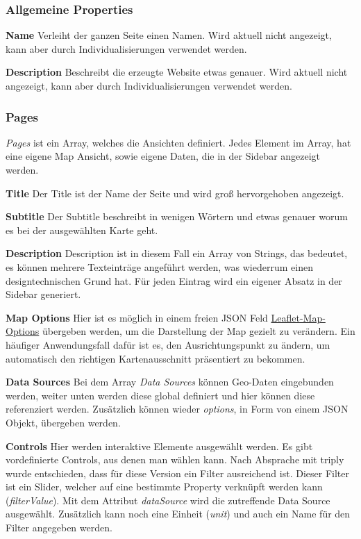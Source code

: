 \subsubsection{Allgemeine Properties}
\textbf{Name}
Verleiht der ganzen Seite einen Namen.
Wird aktuell nicht angezeigt, kann aber durch Individualisierungen verwendet werden.

\textbf{Description}
Beschreibt die erzeugte Website etwas genauer.
Wird aktuell nicht angezeigt, kann aber durch Individualisierungen verwendet werden.

\subsubsection{Pages}
\emph{Pages} ist ein Array, welches die Ansichten definiert.
Jedes Element im Array, hat eine eigene Map Ansicht, sowie eigene Daten, die in der Sidebar angezeigt werden.

\textbf{Title}
Der Title ist der Name der Seite und wird groß hervorgehoben angezeigt.

\textbf{Subtitle}
Der Subtitle beschreibt in wenigen Wörtern und etwas genauer worum es bei der ausgewählten Karte geht.

\textbf{Description}
Description ist in diesem Fall ein Array von Strings, das bedeutet, es können mehrere Texteinträge angeführt werden,
was wiederrum einen designtechnischen Grund hat.
Für jeden Eintrag wird ein eigener Absatz in der Sidebar generiert.

\textbf{Map Options}
Hier ist es möglich in einem freien JSON Feld \href{https://leafletjs.com/SlavaUkraini/reference.html#map-option}{Leaflet-Map-Options}
übergeben werden, um die Darstellung der Map gezielt zu verändern.
Ein häufiger Anwendungsfall dafür ist es, den Ausrichtungspunkt zu ändern, um automatisch den richtigen Kartenausschnitt präsentiert zu bekommen.

\textbf{Data Sources}
Bei dem Array \emph{Data Sources} können Geo-Daten eingebunden werden, weiter unten werden diese global definiert und hier
können diese referenziert werden.
Zusätzlich können wieder \emph{options}, in Form von einem JSON Objekt, übergeben werden.

\textbf{Controls}
Hier werden interaktive Elemente ausgewählt werden.
Es gibt vordefinierte Controls, aus denen man wählen kann.
Nach Absprache mit triply wurde entschieden, dass für diese Version ein Filter ausreichend ist.
Dieser Filter ist ein Slider, welcher auf eine bestimmte Property verknüpft werden kann (\emph{filterValue}).
Mit dem Attribut \emph{dataSource} wird die zutreffende Data Source ausgewählt.
Zusätzlich kann noch eine Einheit (\emph{unit}) und auch ein Name für den Filter angegeben werden.

